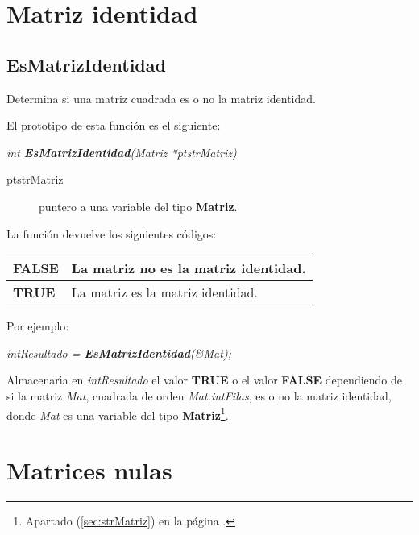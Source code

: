 \newpage

\section{Matriz identidad}

\subsection{EsMatrizIdentidad}
Determina si una matriz cuadrada es o no la matriz identidad.\newline

El prototipo de esta funci\'on es el siguiente:

\begin{center}
\emph{int \textbf{EsMatrizIdentidad}(Matriz *ptstrMatriz)}
\end{center}

\begin{description}
\item[ptstrMatriz] puntero a una variable del tipo \textbf{Matriz}.
\end{description}

La funci\'on devuelve los siguientes c\'odigos:

\begin{center}
\begin{tabular}{|l|l|}
\hline
\textbf{FALSE} & La matriz no es la matriz identidad. \\
\hline
\textbf{TRUE} & La matriz es la matriz identidad. \\
\hline
\end{tabular}
\end{center}

Por ejemplo:

\begin{center}
\emph{intResultado = \textbf{EsMatrizIdentidad}(\&Mat);}
\end{center}

Almacenar\'{\i}a en \emph{intResultado} el valor \textbf{TRUE} o el valor
\textbf{FALSE} dependiendo de si la matriz \emph{Mat}, cuadrada de orden 
\emph{Mat.intFilas}, es o no la matriz identidad, donde \emph{Mat} es una
variable del tipo \textbf{Matriz}\footnote{Apartado (\ref{sec:strMatriz})
en la p\'agina \pageref{sec:strMatriz}.}.

\newpage

\section{Matrices nulas}

